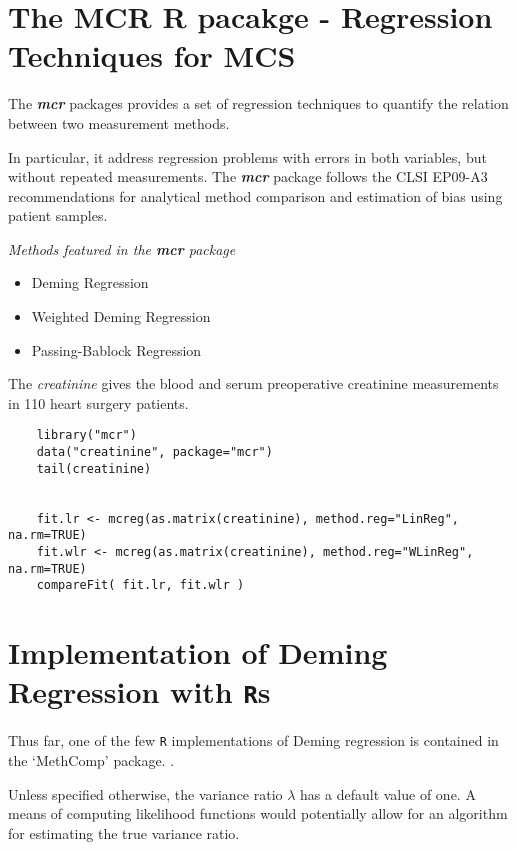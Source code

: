\documentclass[12pt, a4paper]{report}
\theoremstyle{plain}
\theoremstyle{definition}
\theoremstyle{remark}
\begin{document}
\section{The MCR R pacakge - Regression Techniques for MCS}

The \textbf{\textit{mcr}} packages provides a set of regression techniques to quantify the relation between two measurement methods.

In particular, it address regression problems with errors in both variables, but without repeated measurements.
The \textbf{\textit{mcr}} package follows the CLSI EP09-A3 recommendations for analytical
method comparison and estimation of bias using patient samples.


\textit{Methods featured in the \textbf{mcr} package}

\begin{itemize}
	\item Deming Regression
	\item Weighted Deming Regression
	\item Passing-Bablock Regression
\end{itemize}

The \textit{creatinine} gives the blood and serum preoperative creatinine measurements in 110 heart surgery patients.

\begin{framed}
	\begin{verbatim}
	library("mcr")
	data("creatinine", package="mcr")
	tail(creatinine)
	
	
	fit.lr <- mcreg(as.matrix(creatinine), method.reg="LinReg", na.rm=TRUE)
	fit.wlr <- mcreg(as.matrix(creatinine), method.reg="WLinReg", na.rm=TRUE)
	compareFit( fit.lr, fit.wlr )
	\end{verbatim}
\end{framed}


\section{Implementation of Deming Regression with \texttt{R}s}
Thus far, one of the few \texttt{R} implementations of Deming regression is contained in the `MethComp' package. \citep{BXC2008}.

Unless specified otherwise, the variance ratio $\lambda$ has a default value of one. A means of computing likelihood functions would potentially allow for an algorithm for estimating the true variance ratio.
\end{document}
